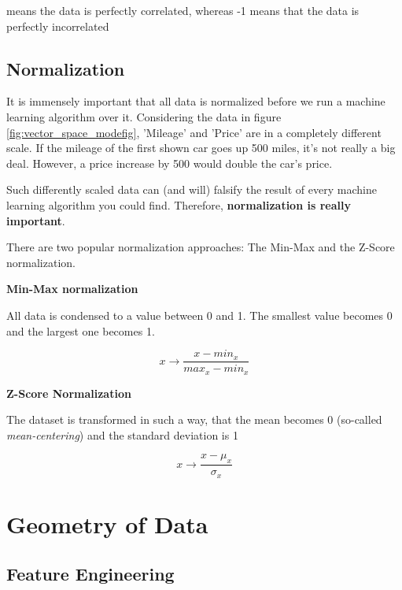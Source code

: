 \documentclass[a4paper, 11pt]{article}
\begin{document}
 means the data is perfectly correlated, whereas -1 means that the data is perfectly incorrelated

\subsection{Normalization}
It is immensely important that all data is normalized before we run a machine learning algorithm over it. Considering the data in figure \ref{fig:vector_space_modefig}, 'Mileage' and 'Price' are in a completely different scale. If the mileage of the first shown car goes up 500 miles, it's not really a big deal. However, a price increase by 500 would double the car's price.

Such differently scaled data can (and will) falsify the result of every machine learning algorithm you could find. Therefore, \textbf{normalization is really important}.

\vspace{10px}

\noindent There are two popular normalization approaches: The Min-Max and the Z-Score normalization. 

\newpage

\noindent \textbf{Min-Max normalization}

\noindent All data is condensed to a value between 0 and 1. The smallest value becomes 0 and the largest one becomes 1.

\begin{equation}
	x \rightarrow \frac{x - min_{x}}{max_{x}-min_{x}}
\end{equation}

\noindent \textbf{Z-Score Normalization}

\noindent The dataset is transformed in such a way, that the mean becomes 0 (so-called \textit{mean-centering}) and the standard deviation is 1

\begin{equation}
	x \rightarrow \frac{x - \mu_{x}}{\sigma_{x}}
\end{equation}

\section{Geometry of Data}

\subsection{Feature Engineering}
\end{document}
